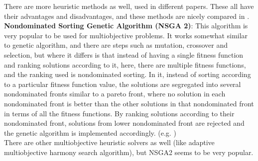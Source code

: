There are more heuristic methods as well, used in different papers. These all have their advantages and disadvantages, and these methods are nicely compared in \citep{mgrrev01}.\\
\textbf{Nondominated Sorting Genetic Algorithm (NSGA 2)}: This algorithm is very popular to be used for multiobjective problems. It works somewhat similar to genetic algorithm, and there are steps such as mutation, crossover and selection, but where it differs is that instead of having a single fitness function and ranking solutions according to it, here, there are multiple fitness functions, and the ranking used is nondominated sorting. In it, instead of sorting according to a particular fitness function value, the solutions are segregated into several nondominated fronts similar to a pareto front, where no solution in each nondominated front is better than the other solutions in that nondominated front in terms of all the fitness functions. By ranking solutions according to their nondominated front, solutions from lower nondominated front are rejected and the genetic algorithm is implemented accordingly. (e.g. \citep{mgrj14})\\ 
There are other multiobjective heuristic solvers as well (like adaptive multiobjective harmony search algorithm)\citep{mgrj42}, but NSGA2 seems to be very popular. 

